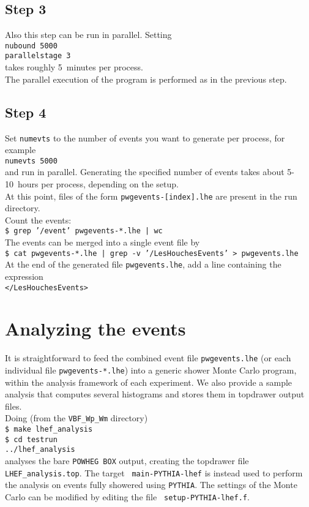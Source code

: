 \documentclass[a4paper,11pt]{article}
\begin{document}
\subsection*{Step 3}
%
Also this step can be run in parallel. 
Setting
\\[2ex]
{\tt nubound 5000}
\\
{\tt parallelstage  3}
\\[2ex]
takes roughly 5~minutes per process.
\\[2ex] 
The parallel execution of the program is
performed as in the previous step.

\subsection*{Step 4}
%
Set {\tt numevts} to the number of events you want to generate per
process, for example
\\[2ex]
{\tt numevts 5000}
\\[2ex]
and run in parallel. 
Generating the specified number of
events takes about 5-10~hours per process, depending on the setup.
\\[2ex]
At this point, files of the form {\tt pwgevents-[index].lhe} are
present in the run directory.
\\[2ex]
Count the events:
\\[2ex]
{\tt \$ grep '/event' pwgevents-*.lhe | wc}
\\[2ex]
The events can be merged into a single event file by
\\[2ex]
{\tt \$ cat pwgevents-*.lhe | grep -v '/LesHouchesEvents' >
  pwgevents.lhe}
\\[2ex]
At the end of the generated file {\tt pwgevents.lhe}, add a line containing the expression
\\[2ex]
{\tt </LesHouchesEvents>}




\section*{Analyzing the events}
%
It is straightforward to feed the combined event file {\tt pwgevents.lhe} (or each individual file {\tt pwgevents-*.lhe}) into a generic
shower Monte Carlo program, within the analysis framework of each
experiment. We also provide a sample analysis that computes several
histograms and stores them in topdrawer output files.
\\[2ex]
Doing (from the {\tt VBF\_Wp\_Wm} directory)
\\[2ex]
{\tt \$ make lhef\_analysis}
\\[2ex]
{\tt \$ cd testrun}
\\[2ex]
{\tt ../lhef\_analysis}
\\[2ex]
analyses the bare {\tt POWHEG BOX} output, creating the topdrawer file
{\tt LHEF\_analysis.top}. The target {\tt
  main-PYTHIA-lhef} is instead used to perform the analysis on events
fully showered using  {\tt PYTHIA}. The settings of
the Monte Carlo can be modified by editing the file {\tt
  setup-PYTHIA-lhef.f}. 
%
\end{document}

